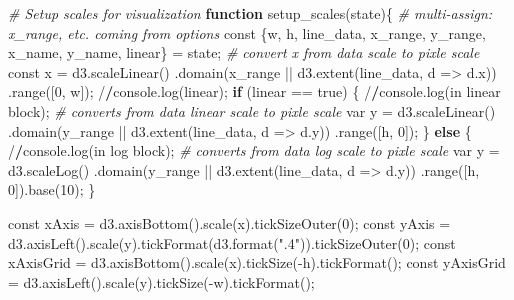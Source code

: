 \documentclass[print]{nuthesis}
\newenvironment{Shaded}{\begin{snugshade}}{\end{snugshade}}
\newcommand{\AttributeTok}[1]{\textcolor[rgb]{0.77,0.63,0.00}{#1}}
\newcommand{\CommentTok}[1]{\textcolor[rgb]{0.56,0.35,0.01}{\textit{#1}}}
\newcommand{\ControlFlowTok}[1]{\textcolor[rgb]{0.13,0.29,0.53}{\textbf{#1}}}
\newcommand{\DecValTok}[1]{\textcolor[rgb]{0.00,0.00,0.81}{#1}}
\newcommand{\ErrorTok}[1]{\textcolor[rgb]{0.64,0.00,0.00}{\textbf{#1}}}
\newcommand{\FunctionTok}[1]{\textcolor[rgb]{0.00,0.00,0.00}{#1}}
\newcommand{\NormalTok}[1]{#1}
\newcommand{\OtherTok}[1]{\textcolor[rgb]{0.56,0.35,0.01}{#1}}
\newcommand{\SpecialCharTok}[1]{\textcolor[rgb]{0.00,0.00,0.00}{#1}}
\newcommand{\StringTok}[1]{\textcolor[rgb]{0.31,0.60,0.02}{#1}}
\begin{document}
\begin{Shaded}
\begin{Highlighting}[]
\CommentTok{\# Setup scales for visualization}
\ControlFlowTok{function} \FunctionTok{setup\_scales}\NormalTok{(state)\{}
  \CommentTok{\# multi{-}assign: x\_range, etc. coming from options}
\NormalTok{  const \{w, h, line\_data, x\_range, y\_range, x\_name, y\_name, linear\} }\OtherTok{=}\NormalTok{ state;}
  \CommentTok{\# convert x from data scale to pixle scale}
\NormalTok{  const x }\OtherTok{=} \FunctionTok{d3.scaleLinear}\NormalTok{()}
  \FunctionTok{.domain}\NormalTok{(x\_range }\SpecialCharTok{||} \FunctionTok{d3.extent}\NormalTok{(line\_data, }\AttributeTok{d =}\SpecialCharTok{\textgreater{}}\NormalTok{ d.x))}
  \FunctionTok{.range}\NormalTok{([}\DecValTok{0}\NormalTok{, w]);}
  \SpecialCharTok{/}\ErrorTok{/}\FunctionTok{console.log}\NormalTok{(linear);}
  \ControlFlowTok{if}\NormalTok{ (linear }\SpecialCharTok{==} \StringTok{\textquotesingle{}true\textquotesingle{}}\NormalTok{) \{}
    \SpecialCharTok{/}\ErrorTok{/}\FunctionTok{console.log}\NormalTok{(}\StringTok{\textquotesingle{}in linear block\textquotesingle{}}\NormalTok{);}
    \CommentTok{\# converts from data linear scale to pixle scale}
\NormalTok{    var y }\OtherTok{=} \FunctionTok{d3.scaleLinear}\NormalTok{()}
    \FunctionTok{.domain}\NormalTok{(y\_range }\SpecialCharTok{||} \FunctionTok{d3.extent}\NormalTok{(line\_data, }\AttributeTok{d =}\SpecialCharTok{\textgreater{}}\NormalTok{ d.y))}
    \FunctionTok{.range}\NormalTok{([h, }\DecValTok{0}\NormalTok{]);}
\NormalTok{  \} }\ControlFlowTok{else}\NormalTok{ \{}
    \SpecialCharTok{/}\ErrorTok{/}\FunctionTok{console.log}\NormalTok{(}\StringTok{\textquotesingle{}in log block\textquotesingle{}}\NormalTok{);}
    \CommentTok{\# converts from data log scale to pixle scale}
\NormalTok{    var y }\OtherTok{=} \FunctionTok{d3.scaleLog}\NormalTok{()}
    \FunctionTok{.domain}\NormalTok{(y\_range }\SpecialCharTok{||} \FunctionTok{d3.extent}\NormalTok{(line\_data, }\AttributeTok{d =}\SpecialCharTok{\textgreater{}}\NormalTok{ d.y))}
    \FunctionTok{.range}\NormalTok{([h, }\DecValTok{0}\NormalTok{])}\FunctionTok{.base}\NormalTok{(}\DecValTok{10}\NormalTok{);}
\NormalTok{  \}}
  
\NormalTok{  const xAxis }\OtherTok{=} \FunctionTok{d3.axisBottom}\NormalTok{()}\FunctionTok{.scale}\NormalTok{(x)}\FunctionTok{.tickSizeOuter}\NormalTok{(}\DecValTok{0}\NormalTok{);}
\NormalTok{  const yAxis }\OtherTok{=} \FunctionTok{d3.axisLeft}\NormalTok{()}\FunctionTok{.scale}\NormalTok{(y)}\FunctionTok{.tickFormat}\NormalTok{(}\FunctionTok{d3.format}\NormalTok{(}\StringTok{".4"}\NormalTok{))}\FunctionTok{.tickSizeOuter}\NormalTok{(}\DecValTok{0}\NormalTok{);}
\NormalTok{  const xAxisGrid }\OtherTok{=} \FunctionTok{d3.axisBottom}\NormalTok{()}\FunctionTok{.scale}\NormalTok{(x)}\FunctionTok{.tickSize}\NormalTok{(}\SpecialCharTok{{-}}\NormalTok{h)}\FunctionTok{.tickFormat}\NormalTok{(}\StringTok{\textquotesingle{}\textquotesingle{}}\NormalTok{);}
\NormalTok{  const yAxisGrid }\OtherTok{=} \FunctionTok{d3.axisLeft}\NormalTok{()}\FunctionTok{.scale}\NormalTok{(y)}\FunctionTok{.tickSize}\NormalTok{(}\SpecialCharTok{{-}}\NormalTok{w)}\FunctionTok{.tickFormat}\NormalTok{(}\StringTok{\textquotesingle{}\textquotesingle{}}\NormalTok{);}
  

\end{Highlighting}
\end{Shaded}
\end{document}
